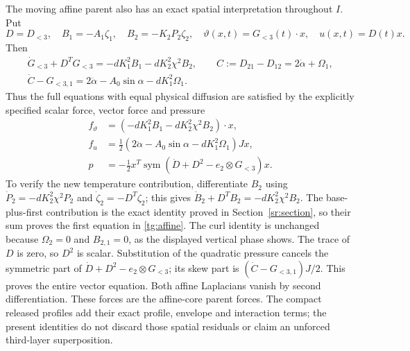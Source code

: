 The moving affine parent also has an exact spatial interpretation
throughout $I$. Put
\[
 D=D_{<3},\quad B_1=-A_1\zeta_1,\quad B_2=-K_2P_2\zeta_2,
 \quad\vartheta(x,t)=G_{<3}(t)\cdot x,\quad u(x,t)=D(t)x.
\]
Then
\begin{equation}\label{tg:affine}
\begin{gathered}
 \dot G_{<3}+D^TG_{<3}=-dK_1^2B_1-dK_2^2\chi^2B_2,\qquad
 C:=D_{21}-D_{12}=2\dot\alpha+\Omega_1,\\
 \dot C-G_{<3,1}=2\ddot\alpha-A_0\sin\alpha-dK_1^2\Omega_1.
\end{gathered}
\end{equation}
Thus the full equations with equal physical diffusion are satisfied by
the explicitly specified scalar force, vector force and pressure
\begin{equation}\label{tg:affine_forces}
\begin{aligned}
 f_\vartheta&=(-dK_1^2B_1-dK_2^2\chi^2B_2)\cdot x,\\
 f_u&=\tfrac12(2\ddot\alpha-A_0\sin\alpha-dK_1^2\Omega_1)Jx,\\
 p&=-\tfrac12x^T\operatorname{sym}
       (\dot D+D^2-e_2\otimes G_{<3})x.
\end{aligned}
\end{equation}
To verify the new temperature contribution, differentiate $B_2$
using $\dot P_2=-dK_2^2\chi^2P_2$ and
$\dot\zeta_2=-D^T\zeta_2$; this gives
$\dot B_2+D^TB_2=-dK_2^2\chi^2B_2$.
The base-plus-first contribution is the exact identity proved in
Section~\ref{sr:section}, so their sum proves the first equation
in \eqref{tg:affine}. The curl identity is unchanged because
$\Omega_2=0$ and $B_{2,1}=0$, as the displayed vertical phase shows.
The trace of $D$ is zero, so $D^2$ is scalar. Substitution of the
quadratic pressure cancels the symmetric part of
$\dot D+D^2-e_2\otimes G_{<3}$; its skew part is
$(\dot C-G_{<3,1})J/2$. This proves the entire vector equation.
Both affine Laplacians vanish by second differentiation.
These forces are the affine-core parent forces. The compact released
profiles add their exact profile, envelope and interaction terms;
the present identities do not discard those spatial residuals or
claim an unforced third-layer superposition.
